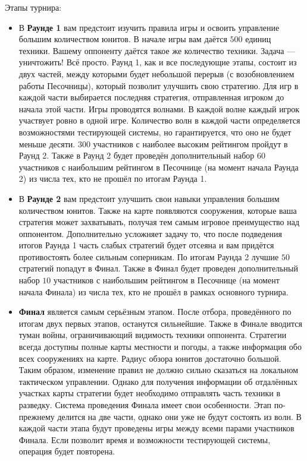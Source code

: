 Этапы турнира:
\begin{itemize}
  \item В \textbf{Раунде 1} вам предстоит изучить правила игры и освоить управление большим количеством юнитов. В начале игры вам даётся
        $500$ единиц техники. Вашему оппоненту даётся такое же количество техники. Задача --- уничтожить! Всё просто. Раунд 1, как и все
        последующие этапы, состоит из двух частей, между которыми будет небольшой перерыв (с возобновлением работы Песочницы), который
        позволит улучшить свою стратегию. Для игр в каждой части выбирается последняя стратегия, отправленная игроком до начала этой части.
        Игры проводятся волнами. В каждой волне каждый игрок участвует ровно в одной игре. Количество волн в каждой части определяется
        возможностями тестирующей системы, но гарантируется, что оно не будет меньше десяти. $300$ участников с наиболее высоким рейтингом
        пройдут в Раунд 2. Также в Раунд 2 будет проведён дополнительный набор $60$ участников с наибольшим рейтингом в Песочнице (на момент
        начала Раунда 2) из числа тех, кто не прошёл по итогам Раунда 1.
  \item В \textbf{Раунде 2} вам предстоит улучшить свои навыки управления большим количеством юнитов. Также на карте появляются сооружения,
        которые ваша стратегия может захватывать, получая тем самым игровое преимущество над оппонентом. Дополнительно усложняет задачу то,
        что после подведения итогов Раунда 1 часть слабых стратегий будет отсеяна и вам придётся противостоять более сильным соперникам. По
        итогам Раунда 2 лучшие $50$ стратегий попадут в Финал. Также в Финал будет проведен дополнительный набор $10$ участников с
        наибольшим рейтингом в Песочнице (на момент начала Финала) из числа тех, кто не прошёл в рамках основного турнира.
  \item \textbf{Финал} является самым серьёзным этапом. После отбора, проведённого по итогам двух первых этапов, останутся сильнейшие. Также
        в Финале вводится туман войны, ограничивающий видимость техники оппонента. Стратегии всегда доступны полные карты местности и
        погоды, а также информация обо всех сооружениях на карте. Радиус обзора юнитов достаточно большой. Таким образом, изменение правил
        не должно сильно сказаться на локальном тактическом управлении. Однако для получения информации об отдалённых участках карты
        стратегии будет необходимо отправлять часть техники в разведку. Система проведения Финала имеет свои особенности. Этап по-прежнему
        делится на две части, однако они уже не будут состоять из волн. В каждой части этапа будут проведены игры между всеми парами
        участников Финала. Если позволит время и возможности тестирующей системы, операция будет повторена.
\end{itemize}

